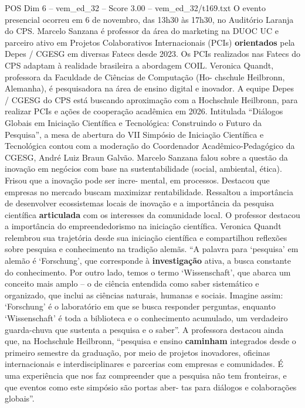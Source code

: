\begin{textsample}{POS Dim 6 – vem\_ed\_32 – Score 3.00 – vem\_ed\_32/t169.txt}
O evento presencial ocorreu em 6 de novembro, das 13h30 às 17h30, no Auditório Laranja do CPS.
Marcelo Sanzana é professor da área do marketing na DUOC UC e parceiro ativo em Projetos Colaborativos Internacionais (PCIs) \textbf{orientados} pela Depes / CGESG em diversas Fatecs desde 2023.
Os PCIs realizados nas Fatecs do CPS adaptam à realidade brasileira a abordagem COIL.
Veronica Quandt, professora da Faculdade de Ciências de Computação (Ho- chschule Heilbronn, Alemanha), é pesquisadora na área de ensino digital e inovador.
A equipe Depes / CGESG do CPS está buscando aproximação com a Hochschule Heilbronn, para realizar PCIs e ações de cooperação acadêmica em 2026.
Intitulada “Diálogos Globais em Iniciação Científica e Tecnológica: Construindo o Futuro da Pesquisa”, a mesa de abertura do VII Simpósio de Iniciação Científica e Tecnológica contou com a moderação do Coordenador Acadêmico-Pedagógico da CGESG, André Luiz Braun Galvão.
Marcelo Sanzana falou sobre a questão da inovação em negócios com base na sustentabilidade (social, ambiental, ética).
Frisou que a inovação pode ser incre- mental, em processos.
Destacou que empresas no mercado buscam maximizar rentabilidade.
Ressaltou a importância de desenvolver ecossistemas locais de inovação e a importância da pesquisa científica \textbf{articulada} com os interesses da comunidade local.
O professor destacou a importância do empreendedorismo na iniciação científica.
Veronica Quandt relembrou sua trajetória desde sua iniciação científica e compartilhou reflexões sobre pesquisa e conhecimento na tradição alemãs. “A palavra para ‘pesquisa’ em alemão é ‘Forschung’, que corresponde à \textbf{investigação} ativa, a busca constante do conhecimento.
Por outro lado, temos o termo ‘Wissenschaft’, que abarca um conceito mais amplo – o de ciência entendida como saber sistemático e organizado, que inclui as ciências naturais, humanas e sociais.
Imagine assim: ‘Forschung’ é o laboratório em que se busca responder perguntas, enquanto ‘Wissenschaft’ é toda a biblioteca e o conhecimento acumulado, um verdadeiro guarda-chuva que sustenta a pesquisa e o saber”.
A professora destacou ainda que, na Hochschule Heilbronn, “pesquisa e ensino \textbf{caminham} integrados desde o primeiro semestre da graduação, por meio de projetos inovadores, oficinas internacionais e interdisciplinares e parcerias com empresas e comunidades.
É uma experiência que nos faz compreender que a pesquisa não tem fronteiras, e que eventos como este simpósio são portas aber- tas para diálogos e colaborações globais”.

\end{textsample}
